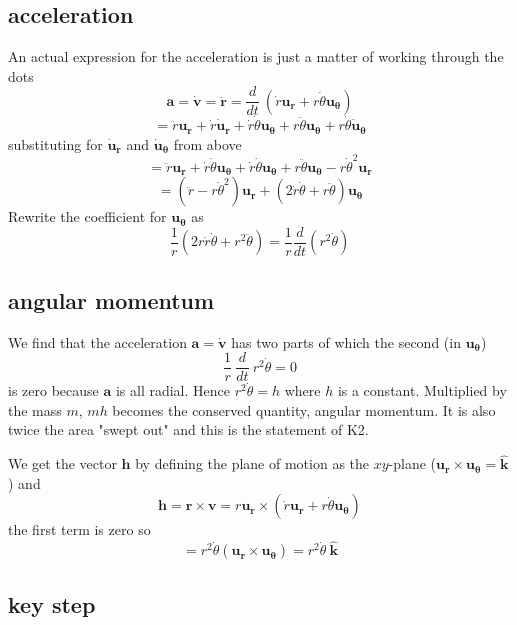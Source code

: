 \documentclass[11pt, oneside]{article}
\begin{document}
\subsection*{acceleration}
An actual expression for the acceleration is just a matter of working through the dots
\[ \mathbf{a} = \dot{\mathbf{v}} = \ddot{\mathbf{r}} = \frac{d}{dt} \ (\dot{r}\mathbf{u_r} + r \dot{\theta} \mathbf{u_{\theta}}) \]
 \[ = \ddot{r}\mathbf{u_r} + \dot{r}\dot{\mathbf{u}}_\mathbf{r} + \dot{r} \dot{\theta} \mathbf{u_{\theta}} + r \ddot{\theta} \mathbf{u_{\theta}} + r \dot{\theta}  \dot{\mathbf{u}}_\mathbf{\theta}\]
substituting for $\dot{\mathbf{u}}_\mathbf{r}$ and $\dot{\mathbf{u}}_\mathbf{\theta}$ from above
\[ = \ddot{r}\mathbf{u_r} + \dot{r}\dot{\theta} \mathbf{u_{\theta}} + \dot{r} \dot{\theta} \mathbf{u_{\theta}} + r \ddot{\theta} \mathbf{u_{\theta}} - r \dot{\theta}^2  \mathbf{u}_\mathbf{r}\]
\[ = (\ddot{r} - r \dot{\theta}^2)  \mathbf{u}_\mathbf{r} + (2\dot{r} \dot{\theta} + r \ddot{\theta}) \mathbf{u_{\theta}}  \]
Rewrite the coefficient for $\mathbf{u_{\theta}}$ as
\[  \frac{1}{r}(2r \dot{r} \dot{\theta} + r^2\ddot{\theta}) = \frac{1}{r} \frac{d}{dt} (r^2\dot{\theta})  \]
\subsection*{angular momentum}
We find that the acceleration $\mathbf{a} = \dot{\mathbf{v}}$ has two parts of which the second (in $\mathbf{u_{\theta}}$)
\[ \frac{1}{r} \ \frac{d}{dt} \ r^2 \dot{\theta} = 0 \]
 is zero because $\mathbf{a}$ is all radial.  Hence $r^2 \dot{\theta} = h$ where $h$ is a constant.  Multiplied by the mass $m$, $mh$ becomes the conserved quantity, angular momentum.  It is also twice the area "swept out" and this is the statement of K2.

We get the vector $\mathbf{h}$ by defining the plane of motion as the $xy$-plane ($\mathbf{u_r} \times \mathbf{u_{\theta}} = \hat{\mathbf{k}}$) and
\[ \mathbf{h} = \mathbf{r} \times \mathbf{v} = r \mathbf{u_r} \times (\dot{r} \mathbf{u_r} +  r \dot{\theta}  \mathbf{u_{\theta}}) \]
the first term is zero so
\[ = r^2  \dot{\theta} ( \mathbf{u_r} \times \mathbf{u_{\theta}} ) = r^2  \dot{\theta}  \ \hat{\mathbf{k}} \]

\subsection*{key step}
\end{document}
